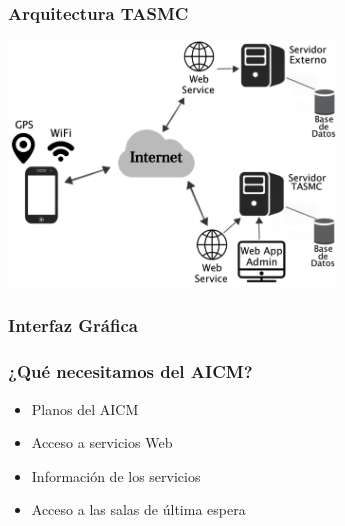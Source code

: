 \documentclass[12pt]{beamer}
\begin{document}
\begin{frame}
	\frametitle{Arquitectura TASMC}
	\begin{center}
		\includegraphics[height=6.5cm]{imagenes/arquitectura.png}	
	\end{center}
\end{frame}

\begin{frame}
	\frametitle{Interfaz Gráfica}
	\begin{block}{}
	\begin{center}
	
  		\end{center}
   \end{block}
\end{frame}

\begin{frame}
	\frametitle{¿Qué necesitamos del AICM?}
	\begin{block}{} \small 
				\begin{itemize}
					\item Planos del AICM
					\item Acceso a servicios Web
					\item Información de los servicios
					\item Acceso a las salas de última espera
				\end{itemize} 
			\end{block} 
\end{frame}
	
\end{document}
